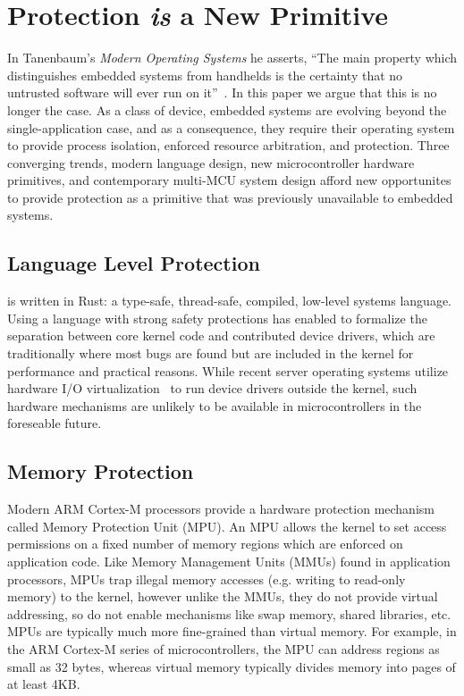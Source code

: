 \section{Protection \emph{is} a New Primitive}

In Tanenbaum's \emph{Modern Operating Systems} he asserts, ``The main property
which distinguishes embedded systems from handhelds is the certainty that no
untrusted software will ever run on it''~\cite{tanenbaum}. In this paper we
argue that this is no longer the case. As a class of device, embedded systems
are evolving beyond the single-application case, and as a consequence, they
require their operating system to provide process isolation, enforced resource
arbitration, and protection.
%
Three converging trends, modern language design, new microcontroller hardware
primitives, and contemporary multi-MCU system design afford new opportunites
to provide protection as a primitive that was previously unavailable to
embedded systems.



\subsection{Language Level Protection}

\name is written in Rust: a type-safe, thread-safe, compiled, low-level systems
language. Using a language with strong safety protections has enabled \name to
formalize the separation between core kernel code and contributed device
drivers, which are traditionally where most bugs are found but are included in
the kernel for performance and practical reasons. While recent server operating
systems utilize hardware I/O virtualization~\cite{arrakis:osdi2014, ix:osdi2014}
to run device drivers outside the kernel, such hardware mechanisms are unlikely
to be available in microcontrollers in the foreseable future.

\subsection{Memory Protection}

Modern ARM Cortex-M processors provide a hardware protection mechanism called
Memory Protection Unit (MPU).  An MPU allows the kernel to set access
permissions on a fixed number of memory regions which are enforced on
application code. Like Memory Management Units (MMUs) found in application
processors, MPUs trap illegal memory accesses (e.g. writing to read-only memory)
to the kernel, however unlike the MMUs, they do not provide virtual addressing,
so do not enable mechanisms like swap memory, shared libraries, etc. MPUs are
typically much more fine-grained than virtual memory. For example, in the ARM
Cortex-M series of microcontrollers, the MPU can address regions as small as 32
bytes, whereas virtual memory typically divides memory into pages of at least
4KB.

